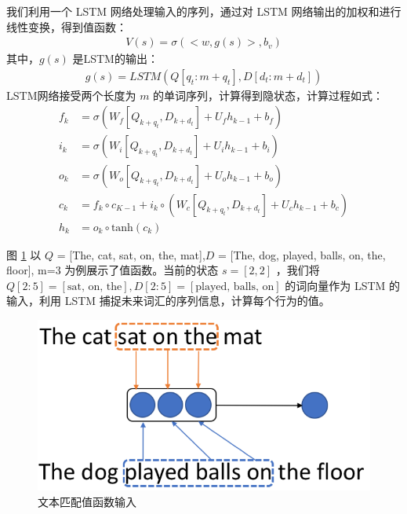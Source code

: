 \begin{enumerate}
		我们利用一个 LSTM 网络处理输入的序列，通过对 LSTM 网络输出的加权和进行线性变换，得到值函数：
	\begin{equation}\label{value_func}
	\begin{aligned}
		V(s) = \sigma(<w, g(s)>, b_v)
	\end{aligned}
	\end{equation}
		其中，$g(s)$ 是LSTM的输出：
	\begin{equation}\label{g(s)}
	\begin{aligned}
		g(s) = LSTM(Q[q_t: m+q_t], D[d_t: m+d_t])
	\end{aligned}
	\end{equation}
		LSTM网络接受两个长度为 $m$ 的单词序列，计算得到隐状态，计算过程如式：
	\begin{equation}\label{mdp_LSTM}
	\begin{aligned}
		f_k &= \sigma(W_f[Q_{k+q_{t}}, D_{k+d_{t}}] + U_fh_{k-1} + b_f) \\
i_k &= \sigma(W_i[Q_{k+q_{t}}, D_{k+d_{t}}] + U_ih_{k-1} + b_i) \\
o_k &= \sigma(W_o[Q_{k+q_{t}}, D_{k+d_{t}}] + U_oh_{k-1} + b_o) \\
c_k &= f_k \circ c_{K-1} + i_k \circ (W_c[Q_{k+q_{t}}, D_{k+d_{t}}] + U_ch_{k-1}+b_c) \\
h_k &= o_k \circ \text{tanh}(c_k)
	\end{aligned}
	\end{equation}

\end{enumerate}

图 \ref{fig:value_function_input} 以 $Q$ = [The, cat, sat, on, the, mat],$D$ = [The, dog, played, balls, on, the, floor], m=3 为例展示了值函数。当前的状态 $s=[2, 2]$ ，我们将 $Q[2:5]=[\text{sat, on, the}], D[2:5]=[\text{played, balls, on}]$ 的词向量作为 LSTM 的输入，利用 LSTM 捕捉未来词汇的序列信息，计算每个行为的值。

\begin{figure}[!htbp]\centering
\vspace{1em}
  \includegraphics[width=0.6\linewidth]{figures/match_value_function}
  \caption{文本匹配值函数输入}
  \label{fig:value_function_input}       %
\vspace{1em}
\end{figure}



